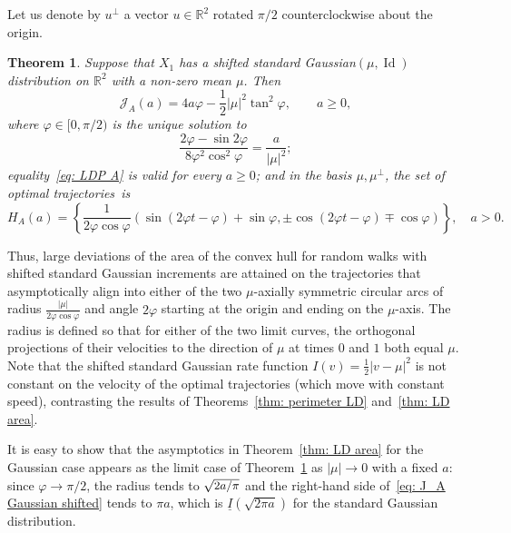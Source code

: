 \documentclass[10pt]{amsart}
\newtheorem{theo}{Theorem}[section]
\theoremstyle{definition}\newtheorem{defi}[theo]{Definition}\newtheorem{rema}[theo]{Remark}\newtheorem{exam}[theo]{Example}\newtheorem{exem}[theo]{Example}\newtheorem{nota}[theo]{Notation}
\DeclareMathOperator{\id}{Id}
\newcommand{\ubar}[1]{\underline{#1}}
\newcommand{\Rbb}{\mathbb{R}}
\newcommand{\Jcl}{\mathcal{J}}
\begin{document}
Let us denote by $u^\bot$ a vector $u \in \Rbb^2$ rotated $\pi/2$ counterclockwise about the origin.


\begin{theo}\label{thm: LD Gaussian area}
Suppose that $X_1$ has a shifted standard Gaussian$(\mu, \id)$ distribution on $\Rbb^2$ with a non-zero mean $\mu$. Then
\begin{equation}\label{eq: J_A Gaussian shifted}
\Jcl_A(a)=4 a \varphi - \frac12 |\mu|^2 \tan^2 \varphi, \qquad a \ge 0,
\end{equation}
where $\varphi \in [0, \pi/2)$ is the unique solution to
\[
\frac{2\varphi - \sin 2 \varphi}{8 \varphi^2 \cos^2 \varphi} = \frac{a}{|\mu|^2};
\]
equality~\eqref{eq: LDP A} is valid for every $a \ge 0$; and in the basis $\mu, \mu^\bot$, the set of optimal trajectories~is
\begin{equation}\label{eq: A shape shifted}
H_A(a)= \left\{ \frac{1}{2 \varphi \cos \varphi} \left(\sin(2 \varphi t - \varphi) + \sin \varphi, \pm \cos(2 \varphi t - \varphi) \mp \cos \varphi \right) \right\}, \quad a>0.
\end{equation}
\end{theo}


Thus, large deviations of the area of the convex hull for random walks with shifted standard Gaussian increments are attained on the trajectories that asymptotically align into either of the two $\mu$-axially symmetric circular arcs of radius $\frac{|\mu|}{2 \varphi \cos \varphi}$ and angle $2 \varphi$ starting at the origin and ending on the $\mu$-axis. The radius is defined so that for either of the two limit curves, the orthogonal projections of their velocities to the direction of $\mu$ at times $0$ and $1$ both equal $\mu$. Note that the shifted standard Gaussian rate function $I(v)=\frac12 |v-\mu|^2$ is not constant on the velocity of the optimal trajectories (which move with constant speed), contrasting the results of Theorems~\ref{thm: perimeter LD} and~\ref{thm: LD area}.


It is easy to show that the asymptotics in Theorem~\ref{thm: LD area} for the Gaussian case appears as the limit case of Theorem~\ref{thm: LD Gaussian area} as $|\mu| \to 0$ with a fixed $a$: since $\varphi \to \pi/2$, the radius tends to $\sqrt{\text{\small{$2a/\pi$}}}$ and the right-hand side of~\eqref{eq: J_A Gaussian shifted} tends to $\pi a$, which is $\ubar I (\sqrt{2 \pi a })$ for the standard Gaussian distribution.
\end{document}
